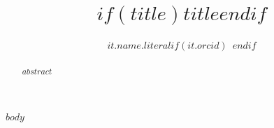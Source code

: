 \documentclass[biblatex,$nonblind$]{apsr_submission}
\title{$if(title)$$title$$endif$}
\author{$it.name.literal$$if(it.orcid)$~\orcidlink{$it.orcid$}$endif$}
        {$for(it.affiliations)$$it.name$$endfor$}
        {$if(it.attributes.corresponding)${Corresponding author. Email: \url{$it.email$} \\}$endif$$if(repo)${Replication materials: \url{$repo$}}$endif$}
\begin{document}
\begin{frontmatter}
\begin{abstract}
    $abstract$
\end{abstract}
\end{frontmatter}
\newpage

$body$

%

\newpage
\printbibliography
\end{document}
